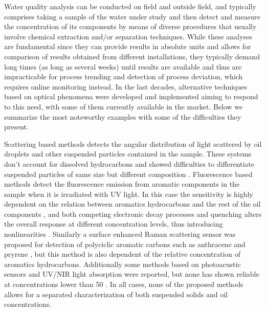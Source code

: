 \documentclass[10pt,authoryear,twocolumn]{article}
\begin{document}
Water quality analysis can be conducted on field and outside field, and typically comprises taking a sample of the water under study and then detect and measure the concentration of its components by means of diverse procedures that usually involve chemical extraction and/or separation techniques. While these analyses are fundamental since they can provide results in absolute units and allows for comparison of results obtained from different installations, they typically demand long times (as long as several weeks) until results are available and thus are impracticable for process trending and detection of process deviation, which requires online monitoring instead. In the last decades, alternative techniques based on optical phenomena were developed and implemented aiming to respond to this need, with some of them currently available in the market. Below we summarize the most noteworthy examples with some of the difficulties they present.

Scattering based methods detects the angular distribution of light scattered by oil droplets and other suspended particles contained in the sample. These systems don't account for dissolved hydrocarbons and showed difficulties to differentiate suspended particles of same size but different composition \citep{He2003}. Fluorescence based methods detect the fluorescence emission from aromatic components in the sample when it is irradiated with UV light. In this case the sensitivity is highly dependent on the relation between aromatics hydrocarbons and the rest of the oil components \citep[ch. 4]{Parker1987}, and both competing electronic decay processes and quenching alters the overall response at different concentration levels, thus introducing nonlinearities \citep{Downare1995}. Similarly a surface enhanced Raman scattering sensor was proposed for detection of polyciclic aromatic carbons such as anthracene and pryrene \citep{Kolomijeca2011}, but this method is also dependent of the relative concentration of aromatics hydrocarbons. Additionally some methods based on photoacustic sensors and UV/NIR light absorption were reported, but none has shown reliable at concentrations lower than \SI{50}{\ppm} \citep{Freeborn1998,He2003}. In all cases, none of the proposed methods allows for a separated characterization of both suspended solids and oil concentrations.
\end{document}
